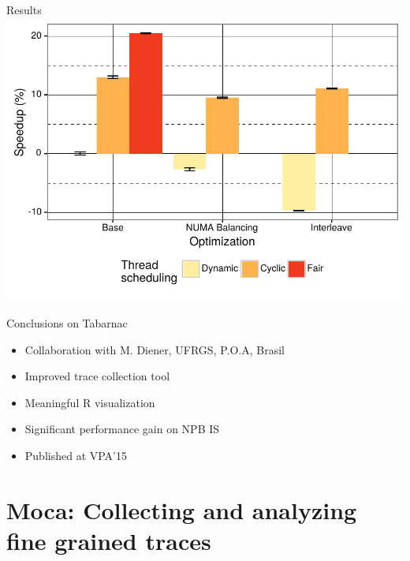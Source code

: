 \documentclass[xcolor={usenames,dvipsnames},hyperref={pdfusetitle}]{beamer}
\begin{document}
\begin{frame}{Results}
    \includegraphics[width=\linewidth]{tabarnac/is_exectime}
\end{frame}

\begin{frame}{Conclusions on Tabarnac}
    \begin{itemize}
        \item Collaboration with M. Diener, UFRGS, P.O.A, Brasil
        \item Improved trace collection tool
        \item Meaningful R visualization
        \item Significant performance gain on NPB IS
        \item Published at VPA'15~\cite{Beniamine15TABARNAC}
    \end{itemize}
\end{frame}

\section{Moca: Collecting and analyzing fine grained traces}
\end{document}
